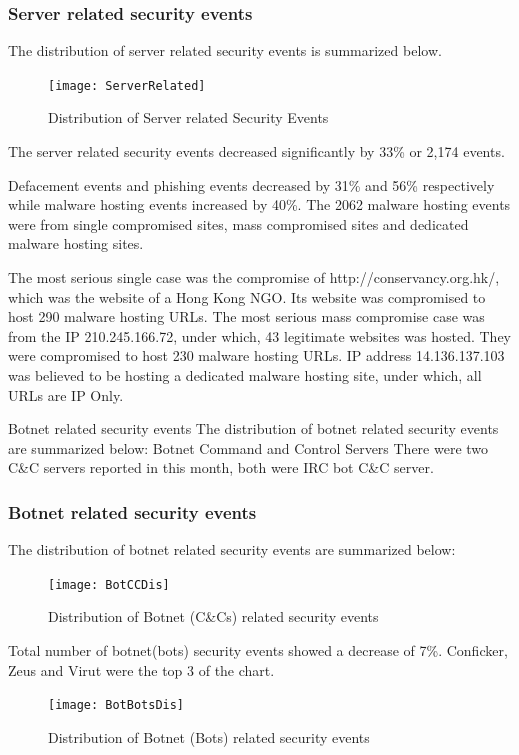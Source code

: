 \documentclass[11pt]{article}
\begin{document}
\subsubsection*{Server related security events}
The distribution of server related security events is summarized below.

\begin{figure}[h!]
\centerline{\texttt{[image: ServerRelated]}}
\caption{Distribution of Server related Security Events}
\end{figure}

The server related security events decreased significantly by 33\% or 2,174 events.

Defacement events and phishing events decreased by 31\% and 56\% respectively while malware hosting events increased by 40\%.
The 2062 malware hosting events were from single compromised sites, mass compromised sites and dedicated malware hosting sites.

The most serious single case was the compromise of http://conservancy.org.hk/, which was the website of a Hong Kong NGO. Its website was compromised to host 290 malware hosting URLs. The most serious mass compromise case was from the IP 210.245.166.72, under which, 43 legitimate websites was hosted. They were compromised to host 230 malware hosting URLs. IP address 14.136.137.103 was believed to be hosting a dedicated malware hosting site, under which, all URLs are IP Only.

Botnet related security events
The distribution of botnet related security events are summarized below:
Botnet Command and Control Servers
There were two C\&C servers reported in this month, both were IRC bot C\&C server.

\subsubsection*{Botnet related security events}
The distribution of botnet related security events are summarized below:
\begin{figure}[h!]
\centerline{\texttt{[image: BotCCDis]}}
\caption{Distribution of Botnet (C\&Cs) related security events}
\end{figure}

Total number of botnet(bots) security events showed a decrease of 7\%. Conficker, Zeus and Virut were the top 3 of the chart.

\begin{figure}[h!]
\centerline{\texttt{[image: BotBotsDis]}}
\caption{Distribution of Botnet (Bots) related security events}
\end{figure}
\end{document}
